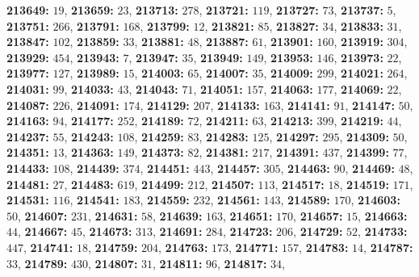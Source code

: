 \textsf{\bfseries 213649:} $19$, \textsf{\bfseries 213659:} $23$, \textsf{\bfseries 213713:} $278$, \textsf{\bfseries 213721:} $119$, \textsf{\bfseries 213727:} $73$, \textsf{\bfseries 213737:} $5$, \textsf{\bfseries 213751:} $266$, \textsf{\bfseries 213791:} $168$, \textsf{\bfseries 213799:} $12$, \textsf{\bfseries 213821:} $85$, \textsf{\bfseries 213827:} $34$, \textsf{\bfseries 213833:} $31$, \textsf{\bfseries 213847:} $102$, \textsf{\bfseries 213859:} $33$, \textsf{\bfseries 213881:} $48$, \textsf{\bfseries 213887:} $61$, \textsf{\bfseries 213901:} $160$, \textsf{\bfseries 213919:} $304$, \textsf{\bfseries 213929:} $454$, \textsf{\bfseries 213943:} $7$, \textsf{\bfseries 213947:} $35$, \textsf{\bfseries 213949:} $149$, \textsf{\bfseries 213953:} $146$, \textsf{\bfseries 213973:} $22$, \textsf{\bfseries 213977:} $127$, \textsf{\bfseries 213989:} $15$, \textsf{\bfseries 214003:} $65$, \textsf{\bfseries 214007:} $35$, \textsf{\bfseries 214009:} $299$, \textsf{\bfseries 214021:} $264$, \textsf{\bfseries 214031:} $99$, \textsf{\bfseries 214033:} $43$, \textsf{\bfseries 214043:} $71$, \textsf{\bfseries 214051:} $157$, \textsf{\bfseries 214063:} $177$, \textsf{\bfseries 214069:} $22$, \textsf{\bfseries 214087:} $226$, \textsf{\bfseries 214091:} $174$, \textsf{\bfseries 214129:} $207$, \textsf{\bfseries 214133:} $163$, \textsf{\bfseries 214141:} $91$, \textsf{\bfseries 214147:} $50$, \textsf{\bfseries 214163:} $94$, \textsf{\bfseries 214177:} $252$, \textsf{\bfseries 214189:} $72$, \textsf{\bfseries 214211:} $63$, \textsf{\bfseries 214213:} $399$, \textsf{\bfseries 214219:} $44$, \textsf{\bfseries 214237:} $55$, \textsf{\bfseries 214243:} $108$, \textsf{\bfseries 214259:} $83$, \textsf{\bfseries 214283:} $125$, \textsf{\bfseries 214297:} $295$, \textsf{\bfseries 214309:} $50$, \textsf{\bfseries 214351:} $13$, \textsf{\bfseries 214363:} $149$, \textsf{\bfseries 214373:} $82$, \textsf{\bfseries 214381:} $217$, \textsf{\bfseries 214391:} $437$, \textsf{\bfseries 214399:} $77$, \textsf{\bfseries 214433:} $108$, \textsf{\bfseries 214439:} $374$, \textsf{\bfseries 214451:} $443$, \textsf{\bfseries 214457:} $305$, \textsf{\bfseries 214463:} $90$, \textsf{\bfseries 214469:} $48$, \textsf{\bfseries 214481:} $27$, \textsf{\bfseries 214483:} $619$, \textsf{\bfseries 214499:} $212$, \textsf{\bfseries 214507:} $113$, \textsf{\bfseries 214517:} $18$, \textsf{\bfseries 214519:} $171$, \textsf{\bfseries 214531:} $116$, \textsf{\bfseries 214541:} $183$, \textsf{\bfseries 214559:} $232$, \textsf{\bfseries 214561:} $143$, \textsf{\bfseries 214589:} $170$, \textsf{\bfseries 214603:} $50$, \textsf{\bfseries 214607:} $231$, \textsf{\bfseries 214631:} $58$, \textsf{\bfseries 214639:} $163$, \textsf{\bfseries 214651:} $170$, \textsf{\bfseries 214657:} $15$, \textsf{\bfseries 214663:} $44$, \textsf{\bfseries 214667:} $45$, \textsf{\bfseries 214673:} $313$, \textsf{\bfseries 214691:} $284$, \textsf{\bfseries 214723:} $206$, \textsf{\bfseries 214729:} $52$, \textsf{\bfseries 214733:} $447$, \textsf{\bfseries 214741:} $18$, \textsf{\bfseries 214759:} $204$, \textsf{\bfseries 214763:} $173$, \textsf{\bfseries 214771:} $157$, \textsf{\bfseries 214783:} $14$, \textsf{\bfseries 214787:} $33$, \textsf{\bfseries 214789:} $430$, \textsf{\bfseries 214807:} $31$, \textsf{\bfseries 214811:} $96$, \textsf{\bfseries 214817:} $34$, 

